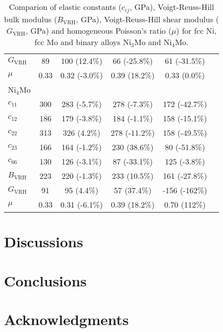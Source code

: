 \documentclass[prb,reprint]{revtex4-2}
\begin{document}
\begin{table*}[h]
\begin{tabular}{lccccc}
$G_{\mathrm{VRH}}$ & 89 & 100 (12.4\%) & 66 (-25.8\%) & 61 (-31.5\%) & \\
$\mu$ & 0.33 & 0.32 (-3.0\%) & 0.39 (18.2\%) & 0.33 (0.0\%) & \\
\hline
Ni$_4$Mo \\
$c_{11}$ & 300 & 283 (-5.7\%) & 278 (-7.3\%) & 172 (-42.7\%) & \\
$c_{12}$ & 186 & 179 (-3.8\%) & 184 (-1.1\%) & 158 (-15.1\%) & \\
$c_{22}$ & 313 & 326 (4.2\%) & 278 (-11.2\%) & 158 (-49.5\%) & \\
\color{blue} $c_{23}$ & 166 & 164 (-1.2\%) & 230 (38.6\%) & 80 (-51.8\%) & \\
\color{blue} $c_{66}$ & 130 & 126 (-3.1\%) & 87 (-33.1\%) & 125 (-3.8\%) & \\
$B_{\mathrm{VRH}}$ & 223 & 220 (-1.3\%) & 233 (10.5\%) & 161 (-27.8\%) & \\
$G_{\mathrm{VRH}}$ & 91 & 95 (4.4\%) & 57 (37.4\%) & -156 (-162\%) & \\
$\mu$ & 0.33 & 0.31 (-6.1\%) & 0.39 (18.2\%) & 0.70 (112\%) & \\
\hline
\end{tabular}
\caption{\label{table:NiMo_elastic_constants}
Comparion of elastic constants ($c_{ij}$, GPa), Voigt-Reuss-Hill bulk modulus 
($B_{\mathrm{VRH}}$, GPa), Voigt-Reuss-Hill shear modulus ($G_{\mathrm{VRH}}$, 
GPa) and homogeneous Poisson's ratio ($\mu$) for fcc Ni, fcc Mo and binary 
alloys Ni$_{3}$Mo and Ni$_{4}$Mo.
}
\end{table*}

% 
%
\section{Discussions}
\label{sec:discussions}

% 
%
\section{Conclusions}
\label{sec:conclusions}

% 
%
\section*{Acknowledgments}
\label{sec:acknowledgments}

% 
%

\end{document}
